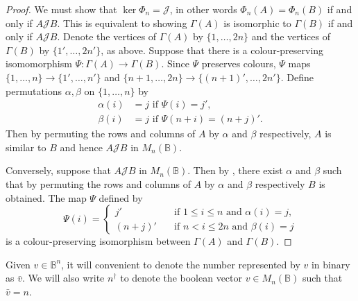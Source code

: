 \documentclass[11pt]{article}
\numberwithin{equation}{section}
\renewcommand{\to}{\longrightarrow}
\newcommand{\B}{\mathbb{B}}
\newcommand{\Bn}{M_n(\B)}
\newcommand{\J}{\mathscr{J}}
\begin{document}
\begin{proof}
  We must show that $\ker\Phi_n = \J$, in other words $\Phi_n(A) = \Phi_n(B)$ if and
  only if $A\J B$. This is equivalent to showing $\Gamma(A)$ is isomorphic to
  $\Gamma(B)$ if and only if $A \J B$. Denote the vertices of $\Gamma(A)$ by
  $\{1, \ldots, 2 n\}$ and the vertices of $\Gamma(B)$ by $\{1', \ldots, 2n'\}$,
  as above.
  Suppose that there is a colour-preserving isomomorphism $\Psi: \Gamma(A) \to
  \Gamma(B)$. Since $\Psi$ preserves colours, $\Psi$ maps $\{1, \ldots, n\} \to
  \{1', \ldots, n'\}$ and $\{n + 1, \ldots, 2n\} \to \{(n + 1)', \ldots, 2n'\}$.
  Define permutations $\alpha, \beta$ on $\{1,\ldots, n\}$ by 
  \begin{align*}
    \alpha(i) &= j \text{ if } \Psi(i) = j',\\
    \beta(i)  &= j \text{ if } \Psi(n + i) = (n + j)'.
  \end{align*}
  Then by permuting the rows and columns of $A$ by $\alpha$ and $\beta$
  respectively, $A$ is similar to $B$ and hence $A \J B$ in $\Bn$.

  Conversely, suppose that $A \J B$ in $\Bn$. Then by
  , there exist $\alpha$ and $\beta$ such
  that by permuting the rows and columns of $A$ by $\alpha$ and $\beta$
  respectively $B$ is obtained. The map $\Psi$ defined by
  \[\Psi(i) = \begin{cases}
      j' \quad &\text{if } 1 \leq i \leq n \text{ and }\alpha(i) = j, \\
      (n + j)' \quad &\text{if } n < i \leq 2n \text{ and }\beta(i) = j
    \end{cases}
  \]
  is a colour-preserving isomorphism between $\Gamma(A)$ and $\Gamma(B)$.
\end{proof}

Given $v \in \B^n$, it will convenient to denote the number represented by $v$
in binary as $\bar{v}$. We will also write $n^\dagger$ to denote the boolean
vector $v \in \Bn$ such that $\bar{v} = n$.
\end{document}
